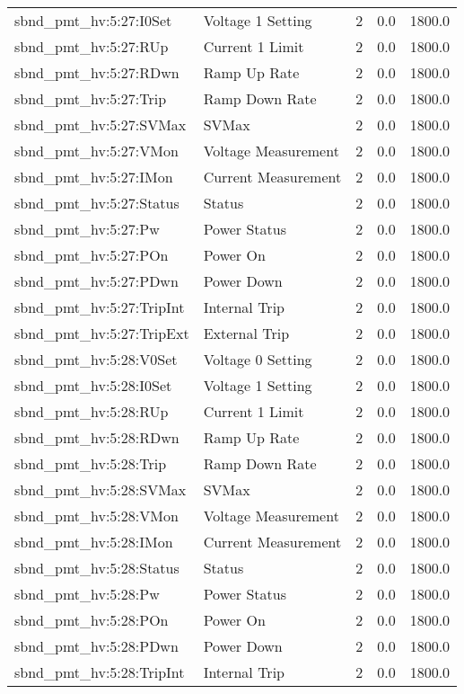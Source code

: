 \begin{center}
\begin{longtable}{l | l l l l }
sbnd\_pmt\_hv:5:27:I0Set & Voltage 1 Setting & 2 & 0.0 & 1800.0\\ 
sbnd\_pmt\_hv:5:27:RUp & Current 1 Limit & 2 & 0.0 & 1800.0\\ 
sbnd\_pmt\_hv:5:27:RDwn & Ramp Up Rate & 2 & 0.0 & 1800.0\\ 
sbnd\_pmt\_hv:5:27:Trip & Ramp Down Rate & 2 & 0.0 & 1800.0\\ 
sbnd\_pmt\_hv:5:27:SVMax & SVMax & 2 & 0.0 & 1800.0\\ 
sbnd\_pmt\_hv:5:27:VMon & Voltage Measurement & 2 & 0.0 & 1800.0\\ 
sbnd\_pmt\_hv:5:27:IMon & Current Measurement & 2 & 0.0 & 1800.0\\ 
sbnd\_pmt\_hv:5:27:Status & Status & 2 & 0.0 & 1800.0\\ 
sbnd\_pmt\_hv:5:27:Pw & Power Status & 2 & 0.0 & 1800.0\\ 
sbnd\_pmt\_hv:5:27:POn & Power On & 2 & 0.0 & 1800.0\\ 
sbnd\_pmt\_hv:5:27:PDwn & Power Down & 2 & 0.0 & 1800.0\\ 
sbnd\_pmt\_hv:5:27:TripInt & Internal Trip & 2 & 0.0 & 1800.0\\ 
sbnd\_pmt\_hv:5:27:TripExt & External Trip & 2 & 0.0 & 1800.0\\ 
sbnd\_pmt\_hv:5:28:V0Set & Voltage 0 Setting & 2 & 0.0 & 1800.0\\ 
sbnd\_pmt\_hv:5:28:I0Set & Voltage 1 Setting & 2 & 0.0 & 1800.0\\ 
sbnd\_pmt\_hv:5:28:RUp & Current 1 Limit & 2 & 0.0 & 1800.0\\ 
sbnd\_pmt\_hv:5:28:RDwn & Ramp Up Rate & 2 & 0.0 & 1800.0\\ 
sbnd\_pmt\_hv:5:28:Trip & Ramp Down Rate & 2 & 0.0 & 1800.0\\ 
sbnd\_pmt\_hv:5:28:SVMax & SVMax & 2 & 0.0 & 1800.0\\ 
sbnd\_pmt\_hv:5:28:VMon & Voltage Measurement & 2 & 0.0 & 1800.0\\ 
sbnd\_pmt\_hv:5:28:IMon & Current Measurement & 2 & 0.0 & 1800.0\\ 
sbnd\_pmt\_hv:5:28:Status & Status & 2 & 0.0 & 1800.0\\ 
sbnd\_pmt\_hv:5:28:Pw & Power Status & 2 & 0.0 & 1800.0\\ 
sbnd\_pmt\_hv:5:28:POn & Power On & 2 & 0.0 & 1800.0\\ 
sbnd\_pmt\_hv:5:28:PDwn & Power Down & 2 & 0.0 & 1800.0\\ 
sbnd\_pmt\_hv:5:28:TripInt & Internal Trip & 2 & 0.0 & 1800.0\\ 

\end{longtable}
\end{center}

